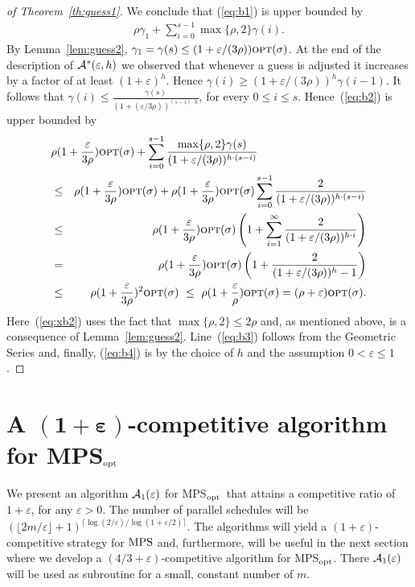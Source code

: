\documentclass{llncs}
\newcommand{\OPT}{\text{{\sc opt}}}
\newcommand{\opt}{\OPT}
\newcommand{\MPS}{{\rm MPS}}
\newcommand{\MPSO}{{\rm MPS$_{\rm opt}$}}
\newcommand{\eps}{\varepsilon}
\begin{document}
\begin{proof}[of Theorem~\ref{th:guess1}]
We conclude that (\ref{eq:b1}) is upper bounded by 
\begin{align}
\rho \gamma_1 + \sum_{i=0}^{s-1}  \max\{\rho,2\}\gamma(i).  \label{eq:b2}
\end{align}
By Lemma~\ref{lem:guess2}, $\gamma_1 =\gamma(s) \leq (1+\eps/(3\rho))  \opt(\sigma)$. 
At the end of the description of ${\cal A^*}(\eps,h)$ we observed that whenever a guess is adjusted it
increases by a factor of at least $(1+\eps)^h$. Hence $\gamma(i) \geq (1+\eps/(3\rho))^h \gamma(i-1)$.
It follows that $\gamma(i) \leq \frac{\gamma(s)}{(1+(\eps/3\rho))^{(s-i)\cdot h}}$, for every $0 \leq i \leq s$. Hence~(\ref{eq:b2}) is upper bounded by
\begin{eqnarray}
\lefteqn{\rho(1+\frac{\eps}{3\rho})\opt(\sigma) + \sum_{i=0}^{s-1}  \frac{\max\{\rho,2\}\gamma(s)}{(1+\eps/(3\rho))^{h\cdot (s-i)}} \notag }\\
& \leq & \rho (1+\frac{\eps}{3\rho})\opt(\sigma) +  \rho(1+\frac{\eps}{3\rho})\opt(\sigma)\sum_{i=0}^{s-1}  \frac{2}{(1+\eps/(3\rho))^{h\cdot (s-i)}} \label{eq:xb2}\\
& \leq & \rho (1+\frac{\eps}{3\rho})\opt(\sigma) \left ( 1 +  \sum_{i=1}^{\infty}  \frac{2}{(1+\eps/(3\rho))^{h\cdot i}} \right ) \notag  \\
& =  & \rho (1+\frac{\eps}{3\rho})\opt(\sigma) \left ( 1 +    \frac{2}{(1+\eps/(3\rho))^h-1} \right )   \label{eq:b3} \\
&\leq  & \rho (1+\frac{\eps}{3\rho})^2\opt(\sigma) \ \leq \ \rho (1+\frac{\eps}{\rho})\opt(\sigma) = (\rho+\eps)\opt(\sigma).    \label{eq:b4} 
\end{eqnarray}
Here~(\ref{eq:xb2}) uses the fact that $\max\{\rho,2\}\leq 2\rho$ and, as mentioned above, is a consequence of
Lemma~\ref{lem:guess2}. Line~(\ref{eq:b3}) follows from the Geometric Series and, finally, (\ref{eq:b4}) is by the choice of $h$ and the assumption $0< \eps\leq 1$. \hspace*{\fill}{$\Box$}
\end{proof}

\section{A { $\mathbf{(1+\eps)}$}-competitive algorithm for \MPSO}\label{sec:ptas}
We present an algorithm ${\cal A}_1(\eps)$ for \MPSO\ that attains a competitive ratio of $1+\eps$, for any
$\eps>0$. The number of parallel schedules will be 
$(\lfloor 2m/\eps\rfloor +1)^{\lceil \log(2/\eps) / \log(1+\eps/2) \rceil }$.
The algorithms will yield a $(1+\eps)$-competitive strategy for $\MPS$ and, furthermore,
will be useful in the next section where we develop a $(4/3+\eps)$-competitive algorithm for \MPSO. 
There ${\cal A}_1(\eps)$ will be used as subroutine for a small, constant number of $m$.
\end{document}
